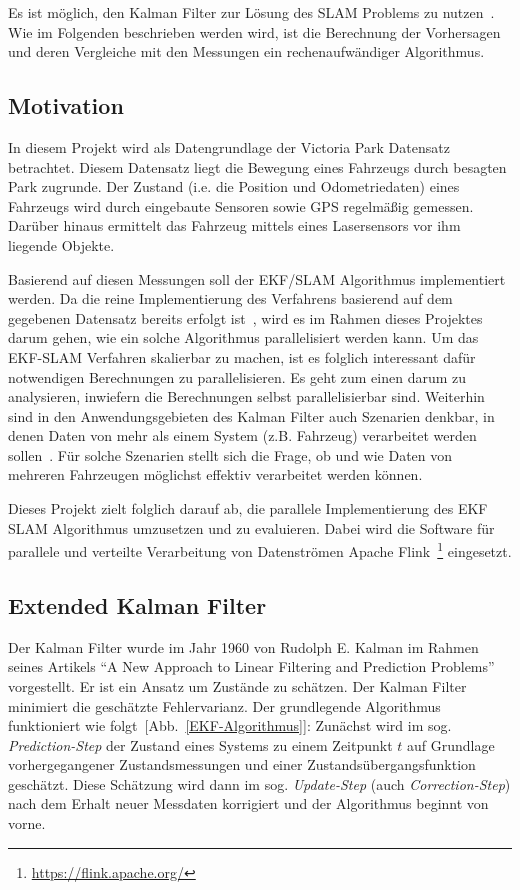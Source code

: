 \documentclass[11pt]{article}
\begin{document}
Es ist möglich, den Kalman Filter zur Lösung des  SLAM Problems zu nutzen~\cite{freiburg_SLAM}. Wie im Folgenden beschrieben werden wird, ist die Berechnung der Vorhersagen und deren Vergleiche mit den Messungen ein rech\-en\-auf\-wän\-di\-ger Algorithmus.

\subsection{Motivation}
In diesem Projekt wird als Datengrundlage der Victoria Park Datensatz betrachtet. Diesem Datensatz liegt die Bewegung eines Fahrzeugs durch besagten Park zugrunde. Der Zustand (i.e. die Position und Odometriedaten) eines Fahrzeugs wird durch eingebaute Sensoren sowie GPS regelmäßig gemessen. Darüber hinaus ermittelt das Fahrzeug mittels eines Lasersensors vor ihm liegende Objekte.

Basierend auf diesen Messungen soll der EKF/SLAM Algorithmus implementiert werden. Da die reine Implementierung des Verfahrens basierend auf dem gegebenen Datensatz bereits erfolgt ist~\cite{ute_SLAM}, wird es im Rahmen dieses Projektes darum gehen, wie ein solche Algorithmus parallelisiert werden kann. Um das EKF-SLAM Verfahren skalierbar zu machen, ist es folglich interessant dafür notwendigen Berechnungen zu parallelisieren. Es geht zum einen darum zu analysieren, inwiefern die Berechnungen selbst parallelisierbar sind. Weiterhin sind in den Anwendungsgebieten des Kalman Filter auch Szenarien denkbar, in denen Daten von mehr als einem System (z.B. Fahrzeug) verarbeitet werden sollen~\cite{vessel}. Für solche Szenarien stellt sich die Frage, ob  und wie Daten von mehreren Fahrzeugen möglichst effektiv verarbeitet werden können.

Dieses Projekt zielt folglich darauf ab, die parallele Implementierung des EKF SLAM Algorithmus umzusetzen und zu evaluieren. Dabei wird die Software für parallele und verteilte Verarbeitung von Datenströmen Apache Flink~\footnote{\url{https://flink.apache.org/}} eingesetzt.

\subsection{Extended Kalman Filter}
Der Kalman Filter wurde im Jahr 1960 von Rudolph E. Kalman im Rahmen seines Artikels “A New Approach to Linear Filtering and Prediction Problems”~\cite{kalman1960new} vorgestellt. Er ist ein Ansatz um Zustände zu schätzen. Der Kalman Filter minimiert die geschätzte Fehlervarianz. Der grundlegende Algorithmus funktioniert wie folgt~[Abb.~\ref{EKF-Algorithmus}]: Zunächst wird im sog. \textit{Prediction-Step} der Zustand eines Systems zu einem Zeitpunkt $t$ auf Grundlage vorhergegangener Zustands\-messungen und einer Zustands\-übergangs\-funktion geschätzt. Diese Schätzung wird dann im sog. \textit{Update-Step} (auch \textit{Correction-Step}) nach dem Erhalt neuer Messdaten korrigiert und der Algorithmus beginnt von vorne.
\end{document}
